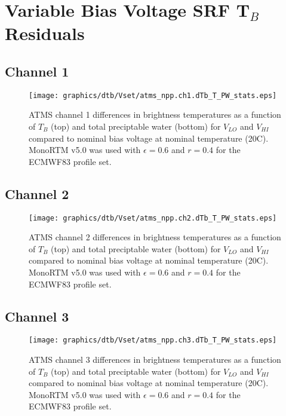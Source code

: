 \section{Variable Bias Voltage SRF T$_B$ Residuals}
\label{app:Vset_dtb_data_plots}

\subsection{Channel 1}
\begin{figure}[H]
  \label{fig:Vset.ch1_dtb}
  \centering
  \hspace{1.5cm}\texttt{[image: graphics/dtb/Vset/atms\_npp.ch1.dTb\_T\_PW\_stats.eps]}
  \caption{ATMS channel 1 differences in brightness temperatures as a function of $T_B$ (top) and total preciptable water (bottom) for $V_{LO}$ and $V_{HI}$ compared to nominal bias voltage at nominal temperature (20\textdegree{}C). MonoRTM v5.0 was used with $\epsilon=0.6$ and $r=0.4$ for the ECMWF83 profile set.}
\end{figure}

\subsection{Channel 2}
\begin{figure}[H]
  \label{fig:Vset.ch2_dtb}
  \centering
  \hspace{1.5cm}\texttt{[image: graphics/dtb/Vset/atms\_npp.ch2.dTb\_T\_PW\_stats.eps]}
  \caption{ATMS channel 2 differences in brightness temperatures as a function of $T_B$ (top) and total preciptable water (bottom) for $V_{LO}$ and $V_{HI}$ compared to nominal bias voltage at nominal temperature (20\textdegree{}C). MonoRTM v5.0 was used with $\epsilon=0.6$ and $r=0.4$ for the ECMWF83 profile set.}
\end{figure}

\subsection{Channel 3}
\begin{figure}[H]
  \label{fig:Vset.ch3_dtb}
  \centering
  \hspace{1.5cm}\texttt{[image: graphics/dtb/Vset/atms\_npp.ch3.dTb\_T\_PW\_stats.eps]}
  \caption{ATMS channel 3 differences in brightness temperatures as a function of $T_B$ (top) and total preciptable water (bottom) for $V_{LO}$ and $V_{HI}$ compared to nominal bias voltage at nominal temperature (20\textdegree{}C). MonoRTM v5.0 was used with $\epsilon=0.6$ and $r=0.4$ for the ECMWF83 profile set.}
\end{figure}

